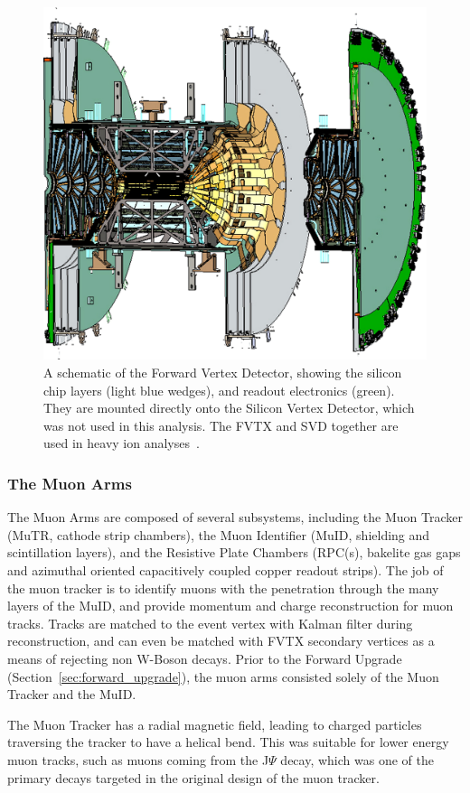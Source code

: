 \begin{figure}[ht]
  \centering
  \includegraphics[width=0.6\linewidth]{./figures/forward_vertex_detector}
  \caption{
    A schematic of the Forward Vertex Detector, showing the silicon chip layers
    (light blue wedges), and readout electronics (green). They are mounted
    directly onto the Silicon Vertex Detector, which was not used in this
    analysis. The FVTX and SVD together are used in heavy ion
    analyses~\cite{Aidala2014}.
  }
  \label{fig:forward_vertex_detector}
\end{figure}


\clearpage
\subsubsection{The Muon Arms}

The Muon Arms are composed of several subsystems, including the Muon Tracker
(MuTR, cathode strip chambers), the Muon Identifier (MuID, shielding and
scintillation layers), and the Resistive Plate Chambers (RPC(s), bakelite gas
gaps and azimuthal oriented capacitively coupled copper readout strips). The job
of the muon tracker is to identify muons with the penetration through the many
layers of the MuID, and provide momentum and charge reconstruction for muon
tracks. Tracks are matched to the event vertex with Kalman filter during
reconstruction, and can even be matched with FVTX secondary vertices as a means
of rejecting non W-Boson decays. Prior to the Forward Upgrade
(Section~\ref{sec:forward_upgrade}), the muon arms consisted solely of the Muon
Tracker and the MuID. 

The Muon Tracker has a radial magnetic field, leading to charged particles
traversing the tracker to have a helical bend. This was suitable for lower
energy muon tracks, such as muons coming from the J$\Psi$ decay, which was one
of the primary decays targeted in the original design of the muon tracker.

